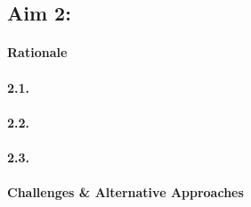 \subsection{Aim 2: \SpecificAimTwo}

\paragraph{Rationale}

\lipsum[1-1]

\paragraph{2.1. \SpecificAimTwoA}

\lipsum[2-2]

\paragraph{2.2. \SpecificAimTwoB}

\lipsum[3-3]

\paragraph{2.3. \SpecificAimTwoC}

\lipsum[4-4]

\paragraph{Challenges \& Alternative Approaches}

\lipsum[5-5]
